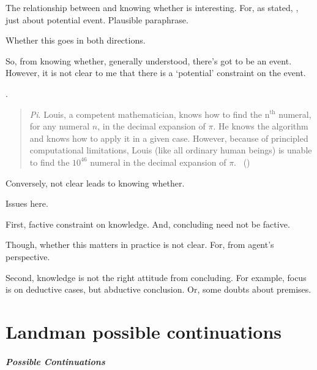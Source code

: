 \begin{note}
  The relationship between  and knowing whether is interesting.
  For, as stated, , just about potential event.
  Plausible paraphrase.

  Whether this goes in both directions.

  So, from knowing whether, generally understood, there's got to be an event.
  However, it is not clear to me that there is a `potential' constraint on the event.

  \cite{Bengson:2011th}.
  \begin{quote}
    \emph{Pi}.
    Louis, a competent mathematician, knows how to find the n\(^{\text{th}}\) numeral, for any numeral \(n\), in the decimal expansion of \(\pi\).
    He knows the algorithm and knows how to apply it in a given case.
    However, because of principled computational limitations, Louis (like all ordinary human beings) is unable to find the \(10^{46}\) numeral in the decimal expansion of \(\pi\).%
    \mbox{ }\hfill\mbox{(\citeyear[170]{Bengson:2011th})}
  \end{quote}

  Conversely, not clear  leads to knowing whether.

  Issues here.

  First, factive constraint on knowledge.
  And, concluding need not be factive.

  Though, whether this matters in practice is not clear.
  For, from agent's perspective.

  Second, knowledge is not the right attitude from concluding.
  For example, focus is on deductive cases, but abductive conclusion.
  Or, some doubts about premises.
\end{note}


\section{Landman possible continuations}
\label{sec:landm-poss-cont}

\subparagraph{Possible Continuations}

